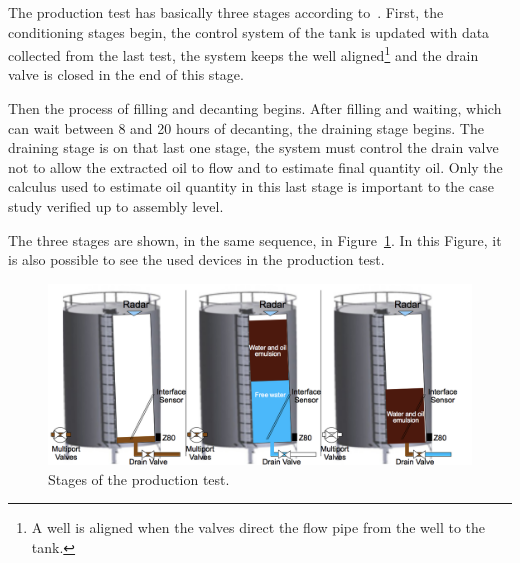 

The production test has basically three stages according to~\cite{LAUT_SERGIO}.
First, the conditioning stages begin, the control system of the tank is updated
with data collected from the last test, the system keeps the well
aligned\footnote{A well is aligned when the valves direct the flow pipe from the
well to the tank.} and the drain valve is closed in the end of this stage.


Then the process of filling and decanting begins. After filling and waiting,
which can wait between 8 and 20 hours of decanting, the draining stage begins.
The draining stage is on that last one stage, the system must control the drain valve
not to allow the extracted oil to flow and to estimate final quantity oil. Only
the calculus used to estimate oil quantity in this last stage is important to the
case study verified up to assembly level.

The three stages are shown, in the same sequence, in Figure~\ref{fig:CaseStudy}.
In this Figure, it is also possible to see the used devices in the production
test.

\begin{figure}[h] \centering \includegraphics[width=1.\textwidth]{images/FasesEstudoDeCaso.png}
\caption{Stages of the production test.}
\label{fig:CaseStudy}
\end{figure}

